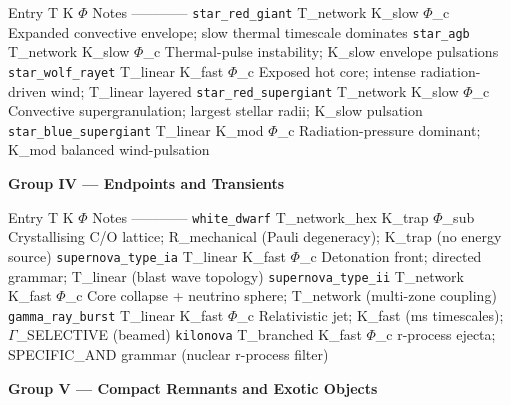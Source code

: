\documentclass[12pt,a4paper]{article}
\begin{document}
\textbar{} Entry \textbar{} T \textbar{} K \textbar{} $\Phi$ \textbar{} Notes \textbar{}
\textbar{}---\textbar{}---\textbar{}---\textbar{}---\textbar{}
\textbar{} \texttt{star\_red\_giant} \textbar{} T\_network \textbar{} K\_slow \textbar{} $\Phi$\_c \textbar{} Expanded convective envelope; slow thermal timescale dominates \textbar{}
\textbar{} \texttt{star\_agb} \textbar{} T\_network \textbar{} K\_slow \textbar{} $\Phi$\_c \textbar{} Thermal-pulse instability; K\_slow envelope pulsations \textbar{}
\textbar{} \texttt{star\_wolf\_rayet} \textbar{} T\_linear \textbar{} K\_fast \textbar{} $\Phi$\_c \textbar{} Exposed hot core; intense radiation-driven wind; T\_linear layered \textbar{}
\textbar{} \texttt{star\_red\_supergiant} \textbar{} T\_network \textbar{} K\_slow \textbar{} $\Phi$\_c \textbar{} Convective supergranulation; largest stellar radii; K\_slow pulsation \textbar{}
\textbar{} \texttt{star\_blue\_supergiant} \textbar{} T\_linear \textbar{} K\_mod \textbar{} $\Phi$\_c \textbar{} Radiation-pressure dominant; K\_mod balanced wind-pulsation \textbar{}

\textbf{Group IV --- Endpoints and Transients}

\textbar{} Entry \textbar{} T \textbar{} K \textbar{} $\Phi$ \textbar{} Notes \textbar{}
\textbar{}---\textbar{}---\textbar{}---\textbar{}---\textbar{}
\textbar{} \texttt{white\_dwarf} \textbar{} T\_network\_hex \textbar{} K\_trap \textbar{} $\Phi$\_sub \textbar{} Crystallising C/O lattice; R\_mechanical (Pauli degeneracy); K\_trap (no energy source) \textbar{}
\textbar{} \texttt{supernova\_type\_ia} \textbar{} T\_linear \textbar{} K\_fast \textbar{} $\Phi$\_c \textbar{} Detonation front; directed grammar; T\_linear (blast wave topology) \textbar{}
\textbar{} \texttt{supernova\_type\_ii} \textbar{} T\_network \textbar{} K\_fast \textbar{} $\Phi$\_c \textbar{} Core collapse + neutrino sphere; T\_network (multi-zone coupling) \textbar{}
\textbar{} \texttt{gamma\_ray\_burst} \textbar{} T\_linear \textbar{} K\_fast \textbar{} $\Phi$\_c \textbar{} Relativistic jet; K\_fast (ms timescales); $\Gamma$\_SELECTIVE (beamed) \textbar{}
\textbar{} \texttt{kilonova} \textbar{} T\_branched \textbar{} K\_fast \textbar{} $\Phi$\_c \textbar{} r-process ejecta; SPECIFIC\_AND grammar (nuclear r-process filter) \textbar{}

\textbf{Group V --- Compact Remnants and Exotic Objects}
\end{document}
